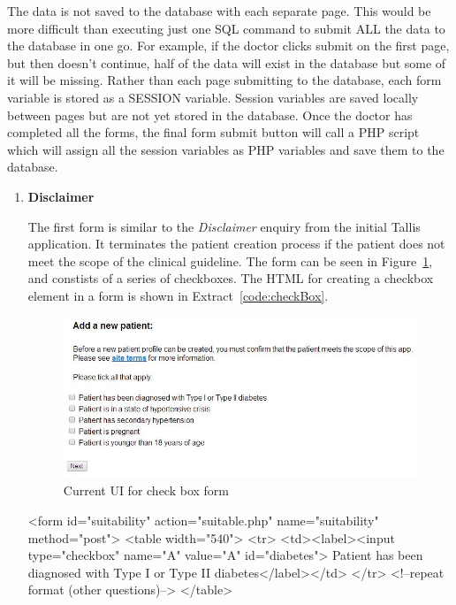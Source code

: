 \documentclass[11pt]{article}
\begin{document}
The data is not saved to the database with each separate page. This would be more difficult than executing just one SQL command to submit ALL the data to the database in one go. For example, if the doctor clicks submit on the first page, but then doesn’t continue, half of the data will exist in the database but some of it will be missing. Rather than each page submitting to the database, each form variable is stored as a SESSION variable. Session variables are saved locally between pages but are not yet stored in the database. Once the doctor has completed all the forms, the final form submit button will call a PHP script which will assign all the session variables as PHP variables and save them to the database.
\begin{enumerate}
\item \textbf{Disclaimer}

The first form is similar to the \textit{Disclaimer} enquiry from the initial Tallis application. It terminates the patient creation process if the patient does not meet the scope of the clinical guideline. The form can be seen in Figure~\ref{fig:formCheckBox}, and constists of a series of checkboxes. The HTML for creating a checkbox element in a form is shown in Extract~\ref{code:checkBox}.

\begin{figure}[ht]
\begin{center}
\includegraphics[scale=0.5]{formCheckBox}
\caption{Current UI for check box form}
\label{fig:formCheckBox}
\end{center}
\end{figure}


\begin{code}[ht]
\begin{html}
<form id="suitability" action="suitable.php" name="suitability" method="post">
  <table width="540">
     <tr>
     <td><label><input type="checkbox" name="A" value="A" id="diabetes">
     Patient has been diagnosed with Type I or Type II diabetes</label></td>
     </tr>
     <!--repeat format (other questions)-->
  </table>


\end{html}
\end{code}
\end{enumerate}
\end{document}
